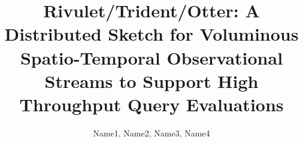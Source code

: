 \documentclass{vldb}
\begin{document}
\title{Rivulet/Trident/Otter: A Distributed Sketch for Voluminous Spatio-Temporal Observational Streams to Support High Throughput Query Evaluations}

\author{
\alignauthor
Name1, Name2, Name3, Name4\\
       \\
       \\
       \\
}


\maketitle










\end{document}
